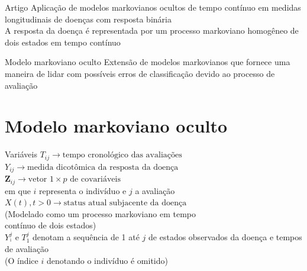 \documentclass[ignorenonframetext,]{beamer}
\begin{document}
\begin{frame}

\vspace{.25cm}\begin{block}{Artigo}
 Aplicação de modelos markovianos ocultos de tempo contínuo em medidas
 longitudinais de doenças com resposta binária \\
 \vspace{.25cm}
 A resposta da doença é representada por um processo markoviano 
 homogêneo de dois estados em tempo contínuo
\end{block}

\vspace{.5cm}

\pause

\begin{block}{Modelo markoviano oculto}
 Extensão de modelos markovianos que fornece uma maneira de lidar com 
 possíveis erros de classificação devido ao processo de avaliação
\end{block}

\end{frame}

\section{Modelo markoviano oculto}\label{modelo-markoviano-oculto}

\begin{frame}

\vspace{.2cm}\begin{block}{Variáveis}
 \(T_{ij} \rightarrow
 \text{tempo cronológico das avaliações}\) \\
 \vspace{.2cm}
 \(Y_{ij} \rightarrow
 \text{medida dicotômica da resposta da doença}\) \\
 \vspace{.2cm}
 \(\textbf{Z}_{ij} \rightarrow
 \text{vetor } 1 \times p \text{ de covariáveis}\) \\
 \vspace{.3cm}
 em que \(i\) representa o indivíduo e \(j\) a avaliação \\
 \vspace{.3cm}
 \pause
 \(X(t), t > 0 \rightarrow \text{status atual subjacente da doença}\) \\
 \hskip 2.4cm (Modelado como um processo markoviano em tempo \\
 \hskip 2.6cm  contínuo de dois estados) \\
 \vspace{.3cm}
 \pause
 \(Y_{^1}^{j} \text{ e } T_{1}^{j}\) denotam a sequência de 1 até \(j\)
 de estados observados da doença e tempos de avaliação \\
 (O índice \(i\) denotando o indivíduo é omitido)
\end{block}

\end{frame}
\end{document}
